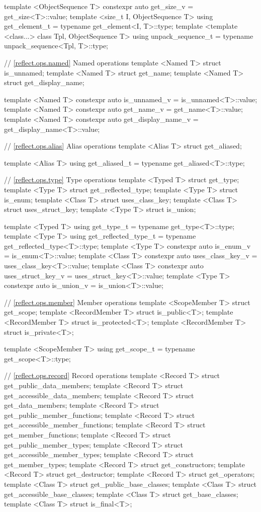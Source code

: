 \begin{std.txt}
\begin{codeblock}
{{{{template <ObjectSequence T>
  constexpr auto get_size_v = get_size<T>::value;
template <size_t I, ObjectSequence T>
  using get_element_t = typename get_element<I, T>::type;
template <template <class...> class Tpl, ObjectSequence T>
  using unpack_sequence_t = typename unpack_sequence<Tpl, T>::type;

// \ref{reflect.ops.named} Named operations
template <Named T> struct is_unnamed;
template <Named T> struct get_name;
template <Named T> struct get_display_name;

template <Named T>
  constexpr auto is_unnamed_v = is_unnamed<T>::value;
template <Named T>
  constexpr auto get_name_v = get_name<T>::value;
template <Named T>
  constexpr auto get_display_name_v = get_display_name<T>::value;

// \ref{reflect.ops.alias} Alias operations
template <Alias T> struct get_aliased;

template <Alias T>
  using get_aliased_t = typename get_aliased<T>::type;

// \ref{reflect.ops.type} Type operations
template <Typed T> struct get_type;
template <Type T> struct get_reflected_type;
template <Type T> struct is_enum;
template <Class T> struct uses_class_key;
template <Class T> struct uses_struct_key;
template <Type T> struct is_union;

template <Typed T>
  using get_type_t = typename get_type<T>::type;
template <Type T>
  using get_reflected_type_t = typename get_reflected_type<T>::type;
template <Type T>
  constexpr auto is_enum_v = is_enum<T>::value;
template <Class T>
  constexpr auto uses_class_key_v = uses_class_key<T>::value;
template <Class T>
  constexpr auto uses_struct_key_v = uses_struct_key<T>::value;
template <Type T>
  constexpr auto is_union_v = is_union<T>::value;

// \ref{reflect.ops.member} Member operations
template <ScopeMember T> struct get_scope;
template <RecordMember T> struct is_public<T>;
template <RecordMember T> struct is_protected<T>;
template <RecordMember T> struct is_private<T>;

template <ScopeMember T>
  using get_scope_t = typename get_scope<T>::type;

// \ref{reflect.ops.record} Record operations
template <Record T> struct get_public_data_members;
template <Record T> struct get_accessible_data_members;
template <Record T> struct get_data_members;
template <Record T> struct get_public_member_functions;
template <Record T> struct get_accessible_member_functions;
template <Record T> struct get_member_functions;
template <Record T> struct get_public_member_types;
template <Record T> struct get_accessible_member_types;
template <Record T> struct get_member_types;
template <Record T> struct get_constructors;
template <Record T> struct get_destructor;
template <Record T> struct get_operators;
template <Class T> struct get_public_base_classes;
template <Class T> struct get_accessible_base_classes;
template <Class T> struct get_base_classes;
template <Class T> struct is_final<T>;

}}}}
\end{codeblock}
\end{std.txt}
